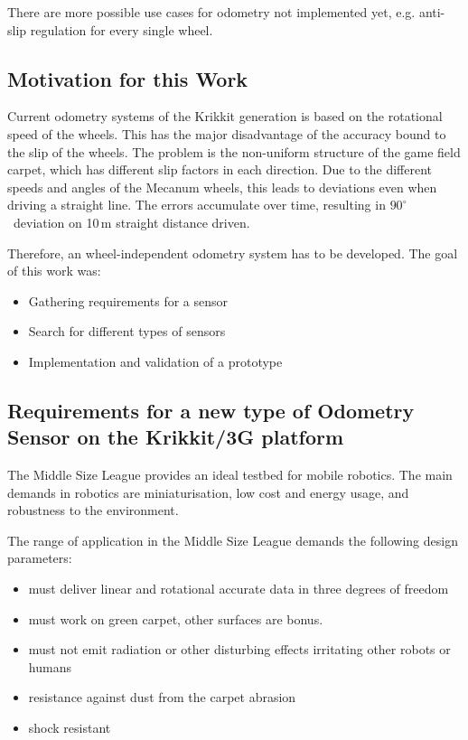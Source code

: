 \documentclass[12pt,a4paper]{article}
\newcommand{\MSL}{Middle Size League\xspace}
\begin{document}
There are more possible use cases for odometry not implemented yet, e.g. anti-slip regulation for every single wheel.



\subsection{Motivation for this Work}
  
Current odometry systems of the Krikkit generation is based on the rotational speed of the wheels.
This has the major disadvantage of the accuracy bound to the slip of the wheels.
The problem is the non-uniform structure of the game field carpet, which has different slip factors in each direction.
Due to the different speeds and angles of the Mecanum wheels, this leads to deviations even when driving a straight line.
The errors accumulate over time, resulting in $90^\circ$~deviation on 10\,m straight distance driven.

Therefore, an wheel-independent odometry system has to be developed.
The goal of this work was:

\begin{itemize}
  \item Gathering requirements for a sensor
  \item Search for different types of sensors
  \item Implementation and validation of a prototype
\end{itemize}


\subsection{Requirements for a new type of Odometry Sensor on the Krikkit/3G platform}

The \MSL provides an ideal testbed for mobile robotics.
The main demands in robotics are miniaturisation, low cost and energy usage, and robustness to the environment.

The range of application in the \MSL demands the following design parameters:
\begin{itemize}
  \item must deliver linear and rotational accurate data in three degrees of freedom
  \item must work on green carpet, other surfaces are bonus.
  \item must not emit radiation or other disturbing effects irritating other robots or humans
  \item resistance against dust from the carpet abrasion
  \item shock resistant
\end{itemize}
\end{document}

